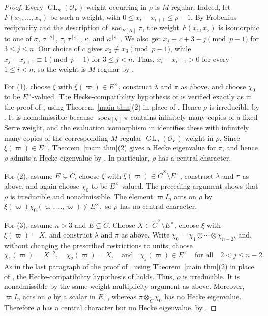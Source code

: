 \documentclass[a4paper,10pt,twoside]{amsart}
\DeclareMathOperator{\GL}{GL}
\theoremstyle{definition}
\numberwithin{equation}{section}
\begin{document}
\begin{proof}
Every \(\GL_n(\mathcal O_F)\)-weight occurring in \(\rho\)
is \(M\)-regular. Indeed, let \(F(x_1,\ldots,x_n)\) be such
a weight, with \(0\leq x_i-x_{i+1}\leq p-1\).
By Frobenius reciprocity and the description of
\(\operatorname{soc}_{E[K]}\pi\), the weight \(F(x_1,x_2)\)
is isomorphic to one of \(\sigma\), \(\sigma^{[s]}\), \(\tau\), \(\tau^{[s]}\), \(\kappa\), and \(\kappa^{[s]}\). We also get $x_j\equiv c+3-j\pmod{p-1}
$ for \(3\leq j\leq n\). Our choice of \(c\) gives \(x_2\not\equiv x_3\pmod{p-1}\),
while
\(x_j-x_{j+1}\equiv1\pmod{p-1}\) for \(3\leq j<n\).
Thus, \(x_i-x_{i+1}>0\) for every \(1\leq i<n\), so the
weight is \(M\)-regular by
\cite[Definition~2.4]{Her11a}.

For \textup{(1)}, choose \(\xi\) with
\(\xi(\varpi)\in E^\times\), construct \(\lambda\) and \(\pi\) as
above, and choose \(\chi_0\) to be \(E^\times\)-valued. The
Hecke-compatibility hypothesis of \cite[Proposition~3.3]{Le24} is
verified exactly as in the proof of \cite[Theorem~3.5]{Le24}, using
Theorem~\ref{main thm}\textup{(2)} in place of \cite[Theorem~3.1(2)]{Le24}. Hence
\(\rho\) is irreducible by \cite[Proposition~3.3]{Le24}. It is
nonadmissible because \(\operatorname{soc}_{E[K]}\pi\) contains
infinitely many copies of a fixed Serre weight, and the evaluation
isomorphism in \cite[Proposition~3.3]{Le24} identifies these with
infinitely many copies of the corresponding \(M\)-regular
\(\GL_n(\mathcal O_F)\)-weight in \(\rho\). Since
\(\xi(\varpi)\in E^\times\), Theorem~\ref{main thm}\textup{(2)} gives a Hecke eigenvalue
for \(\pi\), and hence \(\rho\) admits a Hecke eigenvalue by
\cite[Proposition~3.3]{Le24}. In particular, \(\rho\) has a central
character.

For \textup{(2)}, assume \(E\subsetneq\widetilde C\), choose
\(\xi\) with
\(\xi(\varpi)\in\widetilde C^\times\setminus E^\times\), construct
\(\lambda\) and \(\pi\) as above, and again choose \(\chi_0\) to be
\(E^\times\)-valued. The preceding argument shows that \(\rho\) is
irreducible and nonadmissible. The element \(\varpi I_n\) acts on
\(\rho\) by $\xi(\varpi)\chi_0(\varpi,\ldots,\varpi)
\notin E^\times,$ so \(\rho\) has no central character.

For \textup{(3)}, assume \(n>3\) and
\(E\subsetneq\widetilde C\). Choose
\(X\in\widetilde C^\times\setminus E^\times\), choose \(\xi\) with
\(\xi(\varpi)=X\), and construct \(\lambda\) and \(\pi\) as above.
Write
\(\chi_0=\chi_1\otimes\cdots\otimes\chi_{n-2}\), and, without changing the prescribed restrictions to units, choose
\[
\chi_1(\varpi)=X^{-2},\quad
\chi_2(\varpi)=X,\quad\text{and}\quad
\chi_j(\varpi)\in E^\times\quad \text{for all}\quad 2<j\leq n-2.
\]
As in the last paragraph of the proof of
\cite[Theorem~3.5]{Le24}, using Theorem~\ref{main thm}\textup{(2)} in place of
\cite[Theorem~3.1(2)]{Le24}, the Hecke-compatibility hypothesis of
\cite[Proposition~3.3]{Le24} holds. Thus, \(\rho\) is irreducible. It is nonadmissible by the same
weight-multiplicity argument as above. Moreover, \(\varpi I_n\)
acts on \(\rho\) by a scalar in \(E^\times\), whereas
\(\pi\otimes_{\widetilde C}\chi_0\) has no Hecke eigenvalue.
Therefore \(\rho\) has a central character but no Hecke eigenvalue,
by \cite[Proposition~3.3]{Le24}.


\end{proof}
\end{document}
